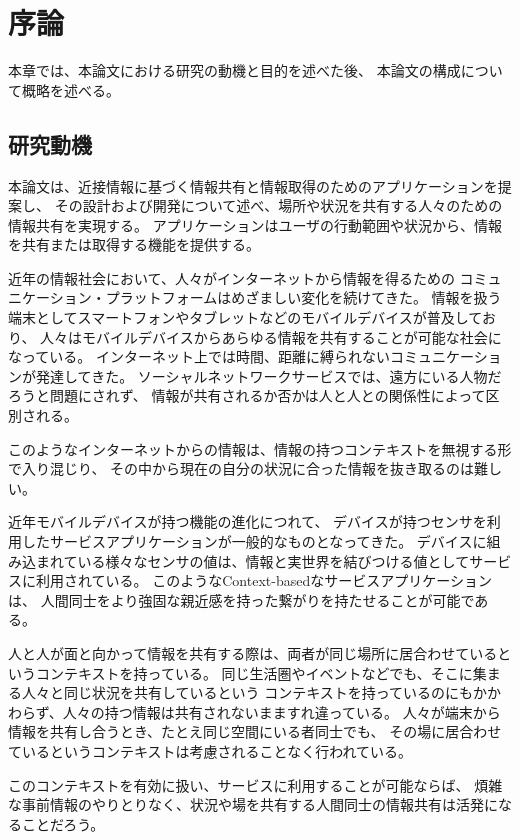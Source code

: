 \chapter{序論}\label{chap:introduction}

本章では、本論文における研究の動機と目的を述べた後、
本論文の構成について概略を述べる。

\newpage

\section{研究動機}

本論文は、近接情報に基づく情報共有と情報取得のためのアプリケーションを提案し、
その設計および開発について述べ、場所や状況を共有する人々のための情報共有を実現する。
アプリケーションはユーザの行動範囲や状況から、情報を共有または取得する機能を提供する。

近年の情報社会において、人々がインターネットから情報を得るための
コミュニケーション・プラットフォームはめざましい変化を続けてきた。
情報を扱う端末としてスマートフォンやタブレットなどのモバイルデバイスが普及しており、
人々はモバイルデバイスからあらゆる情報を共有することが可能な社会になっている。
インターネット上では時間、距離に縛られないコミュニケーションが発達してきた。
ソーシャルネットワークサービスでは、遠方にいる人物だろうと問題にされず、
情報が共有されるか否かは人と人との関係性によって区別される。

このようなインターネットからの情報は、情報の持つコンテキストを無視する形で入り混じり、
その中から現在の自分の状況に合った情報を抜き取るのは難しい。

近年モバイルデバイスが持つ機能の進化につれて、
デバイスが持つセンサを利用したサービスアプリケーションが一般的なものとなってきた。
デバイスに組み込まれている様々なセンサの値は、情報と実世界を結びつける値としてサービスに利用されている。
このようなContext-basedなサービスアプリケーションは、
人間同士をより強固な親近感を持った繋がりを持たせることが可能である。

人と人が面と向かって情報を共有する際は、両者が同じ場所に居合わせているというコンテキストを持っている。
同じ生活圏やイベントなどでも、そこに集まる人々と同じ状況を共有しているという
コンテキストを持っているのにもかかわらず、人々の持つ情報は共有されないまますれ違っている。
人々が端末から情報を共有し合うとき、たとえ同じ空間にいる者同士でも、
その場に居合わせているというコンテキストは考慮されることなく行われている。

このコンテキストを有効に扱い、サービスに利用することが可能ならば、
煩雑な事前情報のやりとりなく、状況や場を共有する人間同士の情報共有は活発になることだろう。

